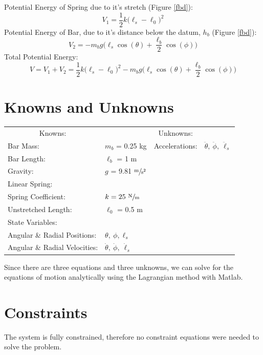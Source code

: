 \documentclass[12pt]{report}
\begin{document}
\begin{flushleft}
Potential Energy of Spring due to it's stretch (Figure \ref{fbd}):
$$V_1 = \frac{1}{2}k\big(\ell_s-\ell_0\big)^2$$
Potential Energy of Bar, due to it's distance below the datum, $h_{b}$ (Figure \ref{fbd}):
$$V_2 = - m_bg\big(\ell_s\cos(\theta) + \frac{\ell_b}{2}\cos(\phi)\big)$$
Total Potential Energy:
\begin{equation}
V = V_1 + V_2 = \frac{1}{2}k\big(\ell_s-\ell_0\big)^2 - m_bg\big(\ell_s\cos(\theta) + \frac{\ell_b}{2}\cos(\phi)\big)
\end{equation}
\newpage
\section{Knowns and Unknowns} \label{knownsandunknowns}
\begin{tabular}{ll@{\hskip .75in}ll}
  \multicolumn{1}{c}{Knowns:} && \multicolumn{1}{c}{Unknowns:} \\
  Bar Mass: &$m_b$ = 0.25 kg & Accelerations: & $\ddot{\theta},~\ddot{\phi},~\ddot{\ell}_s$ \\
  Bar Length: &$\ell_b$ = 1 m & \\
  Gravity: &$g$ = 9.81 $\sfrac{\text{m}}{\text{s$^2$}}$& \\
  Linear Spring: \\
  \quad Spring Coefficient:& $k = 25~\sfrac{\text{N}}{\text{m}}$\\
  \quad Unstretched Length:& $\ell_0$ = 0.5 m \\
  State Variables: \\
  \quad Angular \& Radial Positions: &$\theta,~\phi,\ell_s$ \\
  \quad Angular \& Radial Velocities: &$\dot{\theta},~\dot{\phi},~\dot{\ell}_s$ & \\
\end{tabular}
\vspace{2ex}

Since there are three equations and three unknowns, we can solve for the equations of
motion analytically using the Lagrangian method with Matlab.

\section{Constraints}
The system is fully constrained, therefore no constraint equations were needed to
solve the problem.

\end{flushleft}
\end{document}
